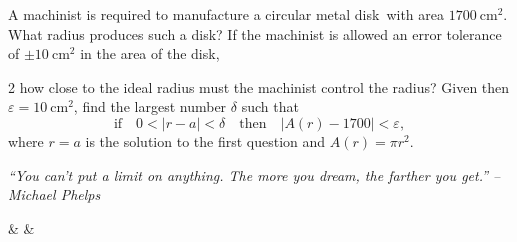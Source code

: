 \documentclass{book}
\begin{document}
\begin{enumerate}[!HW!]
\itemspade A machinist is required to manufacture a circular metal disk\footnotemark\ with area $1700\ \text{cm}^2$. What radius produces such a disk? If the machinist is allowed an error tolerance of $\pm 10\ \text{cm}^2$ in the area of the disk, \vspace{-20pt}
\begin{multicols}{2}
how close to the ideal radius must the machinist control the radius? Given then $\varepsilon = 10\ \text{cm}^2$, find the 
largest number $\delta$ such that \[\text{if}\quad 0<|r-a|< \delta\quad \text{then}\quad |A(r)-1700|< \varepsilon,\] where $r=a$ is the solution to the first question and $A(r) = \pi r^2$.\columnbreak

\end{multicols}
\end{enumerate}

\vfill
{}
\pagebreak
\begin{center} 
\emph{``You can't put a limit on anything. The more you dream, the farther you get.'' -- Michael Phelps}
\end{center}

\begin{Videos}
 &
  &
\end{Videos}

\end{document}
